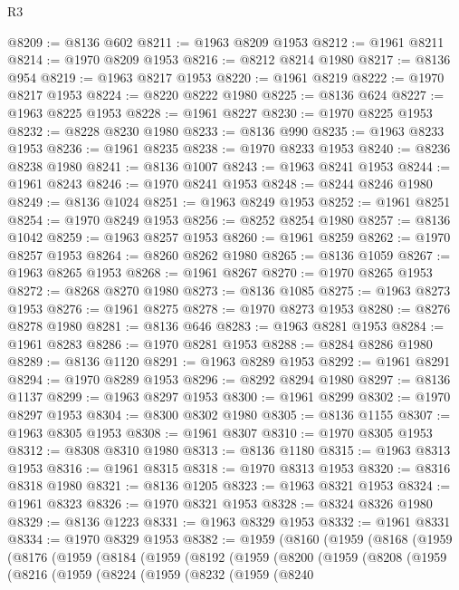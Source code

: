 \begin{lexlean}{R3}
\begin{coremodule}
@8209 := @8136 @602
@8211 := @1963 @8209 @1953
@8212 := @1961 @8211
@8214 := @1970 @8209 @1953
@8216 := @8212 @8214 @1980
@8217 := @8136 @954
@8219 := @1963 @8217 @1953
@8220 := @1961 @8219
@8222 := @1970 @8217 @1953
@8224 := @8220 @8222 @1980
@8225 := @8136 @624
@8227 := @1963 @8225 @1953
@8228 := @1961 @8227
@8230 := @1970 @8225 @1953
@8232 := @8228 @8230 @1980
@8233 := @8136 @990
@8235 := @1963 @8233 @1953
@8236 := @1961 @8235
@8238 := @1970 @8233 @1953
@8240 := @8236 @8238 @1980
@8241 := @8136 @1007
@8243 := @1963 @8241 @1953
@8244 := @1961 @8243
@8246 := @1970 @8241 @1953
@8248 := @8244 @8246 @1980
@8249 := @8136 @1024
@8251 := @1963 @8249 @1953
@8252 := @1961 @8251
@8254 := @1970 @8249 @1953
@8256 := @8252 @8254 @1980
@8257 := @8136 @1042
@8259 := @1963 @8257 @1953
@8260 := @1961 @8259
@8262 := @1970 @8257 @1953
@8264 := @8260 @8262 @1980
@8265 := @8136 @1059
@8267 := @1963 @8265 @1953
@8268 := @1961 @8267
@8270 := @1970 @8265 @1953
@8272 := @8268 @8270 @1980
@8273 := @8136 @1085
@8275 := @1963 @8273 @1953
@8276 := @1961 @8275
@8278 := @1970 @8273 @1953
@8280 := @8276 @8278 @1980
@8281 := @8136 @646
@8283 := @1963 @8281 @1953
@8284 := @1961 @8283
@8286 := @1970 @8281 @1953
@8288 := @8284 @8286 @1980
@8289 := @8136 @1120
@8291 := @1963 @8289 @1953
@8292 := @1961 @8291
@8294 := @1970 @8289 @1953
@8296 := @8292 @8294 @1980
@8297 := @8136 @1137
@8299 := @1963 @8297 @1953
@8300 := @1961 @8299
@8302 := @1970 @8297 @1953
@8304 := @8300 @8302 @1980
@8305 := @8136 @1155
@8307 := @1963 @8305 @1953
@8308 := @1961 @8307
@8310 := @1970 @8305 @1953
@8312 := @8308 @8310 @1980
@8313 := @8136 @1180
@8315 := @1963 @8313 @1953
@8316 := @1961 @8315
@8318 := @1970 @8313 @1953
@8320 := @8316 @8318 @1980
@8321 := @8136 @1205
@8323 := @1963 @8321 @1953
@8324 := @1961 @8323
@8326 := @1970 @8321 @1953
@8328 := @8324 @8326 @1980
@8329 := @8136 @1223
@8331 := @1963 @8329 @1953
@8332 := @1961 @8331
@8334 := @1970 @8329 @1953
@8382 := @1959
    (@8160
      (@1959
        (@8168
          (@1959
            (@8176
              (@1959
                (@8184
                  (@1959
                    (@8192
                      (@1959
                        (@8200
                          (@1959
                            (@8208
                              (@1959
                                (@8216
                                  (@1959
                                    (@8224
                                      (@1959
                                        (@8232
                                          (@1959
                                            (@8240

\end{coremodule}
\end{lexlean}
